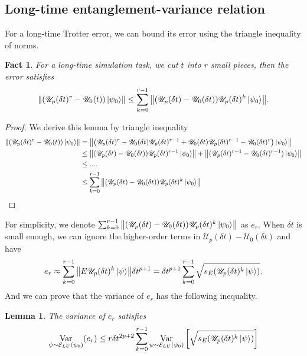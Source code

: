 \documentclass[showpacs,amsmath,amssymb,twocolumn,aps,pra,superscriptaddress,notitlepage,10pt]{revtex4-2}
\newcommand{\cE}{\mathcal E_{LU}}
\newcommand{\sU}{\mathscr U}
\newtheorem{lemma}{Lemma}
\newtheorem{fact}{Fact}
\begin{document}
\subsection{Long-time entanglement-variance relation}
For a long-time Trotter error, we can bound its error using the triangle inequality of norms.
\begin{fact}
    For a long-time simulation task, we cut $t$ into $r$ small pieces, then the error satisfies
    \begin{equation}
        \norm{(\sU_p(\delta t)^r-\sU_0(t))\ket{\psi_0}}
        \le\sum_{k=0}^{r-1}\norm{(\sU_p(\delta t)-\sU_0(\delta t))\sU_p(\delta t)^k\ket{\psi_0}}.
    \end{equation}
\end{fact}
\begin{proof}
    We derive this lemma by triangle inequality
    \begin{equation}
        \begin{aligned}
            \norm{(\sU_p(\delta t)^r-\sU_0(t))\ket{\psi_0}}
            &=\norm{\left(\sU_p(\delta t)^r-\sU_0(\delta t)\sU_p(\delta t)^{r-1}+\sU_0(\delta t)\sU_p(\delta t)^{r-1}-\sU_0(\delta t)^r\right)\ket{\psi_0}}\\
            &\le \norm{(\sU_p(\delta t)-\sU_0(\delta t))\sU_p(\delta t)^{r-1}\ket{\psi_0}}+\norm{(\sU_p(\delta t)^{r-1}-\sU_0(\delta t)^{r-1})\ket{\psi_0}}\\
            &\le....\\
            &\le\sum_{k=0}^{r-1}\norm{(\sU_p(\delta t)-\sU_0(\delta t))\sU_p(\delta t)^k\ket{\psi_0}}
        \end{aligned}
    \end{equation}
\end{proof}
For simplicity, we denote $\sum_{k=0}^{r-1}\norm{(\sU_p(\delta t)-\sU_0(\delta t))\sU_p(\delta t)^k\ket{\psi_0}}$ as $e_r$. When $\delta t$ is small enough, we can ignore the higher-order terms in $\sU_p(\delta t)-\sU_0(\delta t)$ and have
\begin{equation}
    e_r\approx\sum_{k=0}^{r-1}\norm{E\sU_p(\delta t)^k\ket{\psi}}\delta t^{p+1}=\delta t^{p+1}\sum_{k=0}^{r-1}\sqrt{s_E(\sU_p(\delta t)^k\ket{\psi})}.
\end{equation}
And we can prove that the variance of $e_r$ has the following inequality.
\begin{lemma}\label{aplem:sum_var}
The variance of $e_r$ satisfies
    \begin{equation}
        \mathop{\operatorname{Var}}_{\psi\sim\cE(\psi_0)}(e_r)\le r\delta t^{2p+2}\sum_{k=0}^{r-1}\mathop{\operatorname{Var}}_{\psi\sim\cE(\psi_0)}\left[\sqrt{s_E(\sU_p(\delta t)^k\ket{\psi})}\right]
    \end{equation}
\end{lemma}
\end{document}
